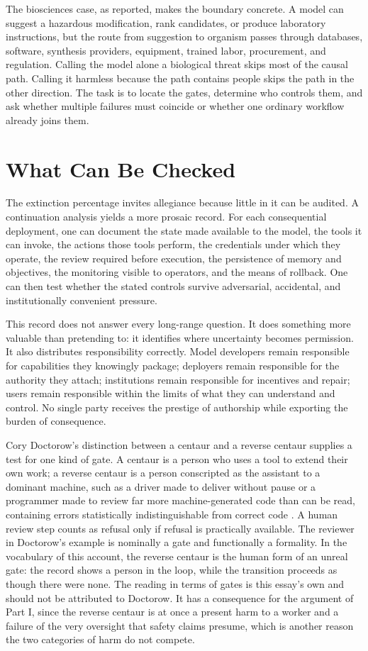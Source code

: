 \documentclass[11pt]{article}
\theoremstyle{definition}
\begin{document}
The biosciences case, as reported, makes the boundary concrete. A model can suggest a hazardous modification, rank candidates, or produce laboratory instructions, but the route from suggestion to organism passes through databases, software, synthesis providers, equipment, trained labor, procurement, and regulation. Calling the model alone a biological threat skips most of the causal path. Calling it harmless because the path contains people skips the path in the other direction. The task is to locate the gates, determine who controls them, and ask whether multiple failures must coincide or whether one ordinary workflow already joins them.

\section{What Can Be Checked}

The extinction percentage invites allegiance because little in it can be audited. A continuation analysis yields a more prosaic record. For each consequential deployment, one can document the state made available to the model, the tools it can invoke, the actions those tools perform, the credentials under which they operate, the review required before execution, the persistence of memory and objectives, the monitoring visible to operators, and the means of rollback. One can then test whether the stated controls survive adversarial, accidental, and institutionally convenient pressure.

This record does not answer every long-range question. It does something more valuable than pretending to: it identifies where uncertainty becomes permission. It also distributes responsibility correctly. Model developers remain responsible for capabilities they knowingly package; deployers remain responsible for the authority they attach; institutions remain responsible for incentives and repair; users remain responsible within the limits of what they can understand and control. No single party receives the prestige of authorship while exporting the burden of consequence.

Cory Doctorow's distinction between a centaur and a reverse centaur supplies a test for one kind of gate. A centaur is a person who uses a tool to extend their own work; a reverse centaur is a person conscripted as the assistant to a dominant machine, such as a driver made to deliver without pause or a programmer made to review far more machine-generated code than can be read, containing errors statistically indistinguishable from correct code \cite{doctorow2026,doctorow2025}. A human review step counts as refusal only if refusal is practically available. The reviewer in Doctorow's example is nominally a gate and functionally a formality. In the vocabulary of this account, the reverse centaur is the human form of an unreal gate: the record shows a person in the loop, while the transition proceeds as though there were none. The reading in terms of gates is this essay's own and should not be attributed to Doctorow. It has a consequence for the argument of Part I, since the reverse centaur is at once a present harm to a worker and a failure of the very oversight that safety claims presume, which is another reason the two categories of harm do not compete.
\end{document}
